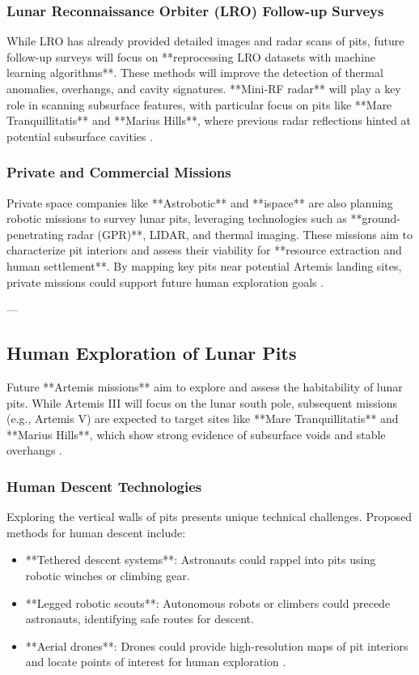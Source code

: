 \subsubsection{Lunar Reconnaissance Orbiter (LRO) Follow-up Surveys}

While LRO has already provided detailed images and radar scans of pits, future follow-up surveys will focus on **reprocessing LRO datasets with machine learning algorithms**. These methods will improve the detection of thermal anomalies, overhangs, and cavity signatures. **Mini-RF radar** will play a key role in scanning subsurface features, with particular focus on pits like **Mare Tranquillitatis** and **Marius Hills**, where previous radar reflections hinted at potential subsurface cavities \cite{Carrer2024, new-wagner}.

\subsubsection{Private and Commercial Missions}

Private space companies like **Astrobotic** and **ispace** are also planning robotic missions to survey lunar pits, leveraging technologies such as **ground-penetrating radar (GPR)**, LIDAR, and thermal imaging. These missions aim to characterize pit interiors and assess their viability for **resource extraction and human settlement**. By mapping key pits near potential Artemis landing sites, private missions could support future human exploration goals \cite{jsanders-isru}.

---

\subsection{Human Exploration of Lunar Pits}

Future **Artemis missions** aim to explore and assess the habitability of lunar pits. While Artemis III will focus on the lunar south pole, subsequent missions (e.g., Artemis V) are expected to target sites like **Mare Tranquillitatis** and **Marius Hills**, which show strong evidence of subsurface voids and stable overhangs \cite{new-wagner, Carrer2024}.

\subsubsection{Human Descent Technologies}

Exploring the vertical walls of pits presents unique technical challenges. Proposed methods for human descent include:
\begin{itemize}
    \item **Tethered descent systems**: Astronauts could rappel into pits using robotic winches or climbing gear. 
    \item **Legged robotic scouts**: Autonomous robots or climbers could precede astronauts, identifying safe routes for descent.
    \item **Aerial drones**: Drones could provide high-resolution maps of pit interiors and locate points of interest for human exploration \cite{thermal-lunar-pits, newer-thermal}.
\end{itemize}


